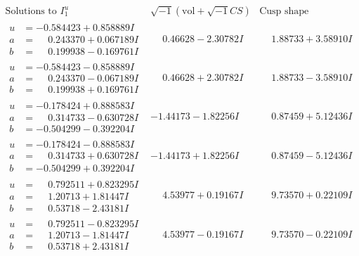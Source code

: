 \documentclass[1p]{elsarticle_modified}
\theoremstyle{definition}
\newcommand{\I}{\sqrt{-1}}
\begin{document}
$$\begin{array}{c|c|c}  
\text{Solutions to }I^u_{1}& \I (\text{vol} + \sqrt{-1}CS) & \text{Cusp shape}\\
 \hline 
\begin{aligned}
u &= -0.584423 + 0.858889 I \\
a &= \phantom{-}0.243370 + 0.067189 I \\
b &= \phantom{-}0.199938 - 0.169761 I\end{aligned}
 & \phantom{-}0.46628 - 2.30782 I & \phantom{-}1.88733 + 3.58910 I \\ \hline\begin{aligned}
u &= -0.584423 - 0.858889 I \\
a &= \phantom{-}0.243370 - 0.067189 I \\
b &= \phantom{-}0.199938 + 0.169761 I\end{aligned}
 & \phantom{-}0.46628 + 2.30782 I & \phantom{-}1.88733 - 3.58910 I \\ \hline\begin{aligned}
u &= -0.178424 + 0.888583 I \\
a &= \phantom{-}0.314733 - 0.630728 I \\
b &= -0.504299 - 0.392204 I\end{aligned}
 & -1.44173 - 1.82256 I & \phantom{-}0.87459 + 5.12436 I \\ \hline\begin{aligned}
u &= -0.178424 - 0.888583 I \\
a &= \phantom{-}0.314733 + 0.630728 I \\
b &= -0.504299 + 0.392204 I\end{aligned}
 & -1.44173 + 1.82256 I & \phantom{-}0.87459 - 5.12436 I \\ \hline\begin{aligned}
u &= \phantom{-}0.792511 + 0.823295 I \\
a &= \phantom{-}1.20713 + 1.81447 I \\
b &= \phantom{-}0.53718 - 2.43181 I\end{aligned}
 & \phantom{-}4.53977 + 0.19167 I & \phantom{-}9.73570 + 0.22109 I \\ \hline\begin{aligned}
u &= \phantom{-}0.792511 - 0.823295 I \\
a &= \phantom{-}1.20713 - 1.81447 I \\
b &= \phantom{-}0.53718 + 2.43181 I\end{aligned}
 & \phantom{-}4.53977 - 0.19167 I & \phantom{-}9.73570 - 0.22109 I \\ \hline\begin{aligned}

\end{aligned}
\end{array}$$
\end{document}

